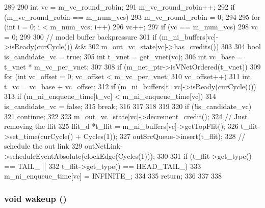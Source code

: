 \begin{DoxyCode}
289 {
290     int vc = m_vc_round_robin;
291     m_vc_round_robin++;
292     if (m_vc_round_robin == m_num_vcs)
293         m_vc_round_robin = 0;
294 
295     for (int i = 0; i < m_num_vcs; i++) {
296         vc++;
297         if (vc == m_num_vcs)
298             vc = 0;
299 
300         // model buffer backpressure
301         if (m_ni_buffers[vc]->isReady(curCycle()) &&
302             m_out_vc_state[vc]->has_credits()) {
303 
304             bool is_candidate_vc = true;
305             int t_vnet = get_vnet(vc);
306             int vc_base = t_vnet * m_vc_per_vnet;
307 
308             if (m_net_ptr->isVNetOrdered(t_vnet)) {
309                 for (int vc_offset = 0; vc_offset < m_vc_per_vnet;
310                      vc_offset++) {
311                     int t_vc = vc_base + vc_offset;
312                     if (m_ni_buffers[t_vc]->isReady(curCycle())) {
313                         if (m_ni_enqueue_time[t_vc] < m_ni_enqueue_time[vc]) {
314                             is_candidate_vc = false;
315                             break;
316                         }
317                     }
318                 }
319             }
320             if (!is_candidate_vc)
321                 continue;
322 
323             m_out_vc_state[vc]->decrement_credit();
324             // Just removing the flit
325             flit_d *t_flit = m_ni_buffers[vc]->getTopFlit();
326             t_flit->set_time(curCycle() + Cycles(1));
327             outSrcQueue->insert(t_flit);
328             // schedule the out link
329             outNetLink->scheduleEventAbsolute(clockEdge(Cycles(1)));
330 
331             if (t_flit->get_type() == TAIL_ ||
332                t_flit->get_type() == HEAD_TAIL_) {
333                 m_ni_enqueue_time[vc] = INFINITE_;
334             }
335             return;
336         }
337     }
338 }
\end{DoxyCode}
\hypertarget{classNetworkInterface__d_ae674290a26ecbd622c5160e38e8a4fe9}{
\subsubsection[{wakeup}]{\setlength{\rightskip}{0pt plus 5cm}void wakeup ()}}
\label{classNetworkInterface__d_ae674290a26ecbd622c5160e38e8a4fe9}


